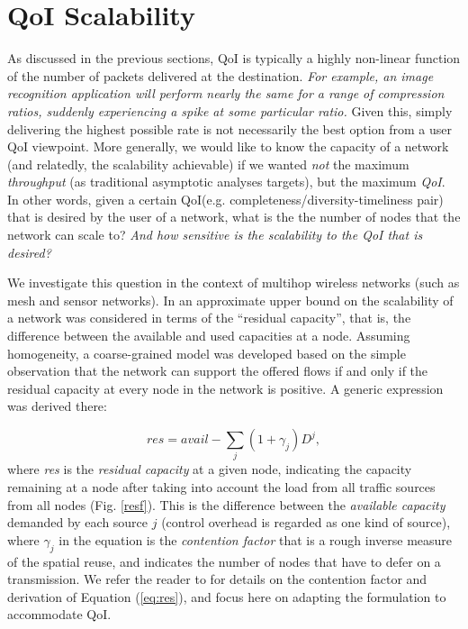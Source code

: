 
\section{QoI Scalability}
\label{sec:qoi_scalability}

As discussed in the previous sections, QoI %
is typically a highly
non-linear function of the number of packets delivered at the
destination.  \emph{For example, an image recognition application will
perform nearly the same for a range of compression ratios, suddenly
experiencing a spike at some particular ratio.} Given this, simply
delivering the highest possible rate is not necessarily the best
option from a user QoI viewpoint. More generally, we would like to know
the capacity of a network (and relatedly, the scalability achievable)
if we wanted {\em not} the maximum {\em throughput} (as traditional
asymptotic analyses targets), but the maximum {\em QoI}. In other
words, given a certain QoI(e.g. completeness/diversity-timeliness pair) that is desired by the  user of a network,
what is the the number of nodes that the network can scale to?\emph{ And how
sensitive is the scalability to the QoI that is desired?}

We investigate this question in the context of multihop wireless networks
(such as mesh and sensor networks).
In \cite{scalability_manets_theory_vs_practice} an approximate upper bound on the
 scalability of a network was
considered in terms of the ``residual capacity'', that is, the difference
between the available and used capacities at a node. Assuming homogeneity, a
coarse-grained model was developed based on the simple observation
that the network can support the offered flows if and only if the
residual capacity at every node in the network is positive.  A generic
expression was derived there:


\begin{equation}
res = avail - \sum_j (1+\gamma_j)D^j,
\label{eq:res}
\end{equation}
where \emph{res} is the {\em residual capacity} at a given node, indicating
the capacity remaining at a node after taking into account the load
from all traffic sources from all nodes (Fig. \ref{resf}). This is the difference
between the {\em available capacity} %
demanded by
each source $j$ (control overhead is regarded as one kind of
source), where $\gamma_j$ in the equation is the {\em contention factor} that is a rough inverse
measure of the spatial reuse, and indicates the number of  nodes that have
to defer on a transmission.
We refer the reader to \cite{scalability_manets_theory_vs_practice} for details on the contention factor
and derivation of Equation (\ref{eq:res}), and focus here on adapting the
formulation to accommodate QoI.

